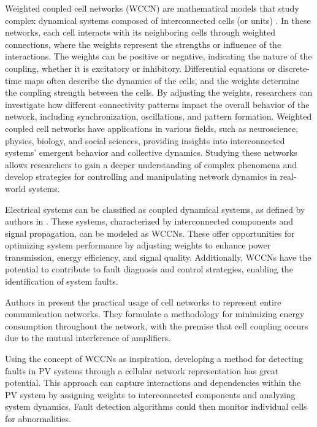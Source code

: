Weighted coupled cell networks (WCCN) are mathematical models that study complex dynamical systems composed of interconnected cells (or units) \cite{Aguiar2010} \cite{Aguiar2020}. In these networks, each cell interacts with its neighboring cells through weighted connections, where the weights represent the strengths or influence of the interactions. The weights can be positive or negative, indicating the nature of the coupling, whether it is excitatory or inhibitory. Differential equations or discrete-time maps often describe the dynamics of the cells, and the weights determine the coupling strength between the cells. By adjusting the weights, researchers can investigate how different connectivity patterns impact the overall behavior of the network, including synchronization, oscillations, and pattern formation. Weighted coupled cell networks have applications in various fields, such as neuroscience, physics, biology, and social sciences, providing insights into interconnected systems' emergent behavior and collective dynamics. Studying these networks allows researchers to gain a deeper understanding of complex phenomena and develop strategies for controlling and manipulating network dynamics in real-world systems.

Electrical systems can be classified as coupled dynamical systems, as defined by authors in \cite{Aguiar2010}. These systems, characterized by interconnected components and signal propagation, can be modeled as WCCNs. These offer opportunities for optimizing system performance by adjusting weights to enhance power transmission, energy efficiency, and signal quality. Additionally, WCCNs have the potential to contribute to fault diagnosis and control strategies, enabling the identification of system faults.

Authors in \cite{Ho2015} present the practical usage of cell networks to represent entire communication networks. They formulate a methodology for minimizing energy consumption throughout the network, with the premise that cell coupling occurs due to the mutual interference of amplifiers.

Using the concept of WCCNs as inspiration, developing a method for detecting faults in PV systems through a cellular network representation has great potential. This approach can capture interactions and dependencies within the PV system by assigning weights to interconnected components and analyzing system dynamics. Fault detection algorithms could then monitor individual cells for abnormalities.

